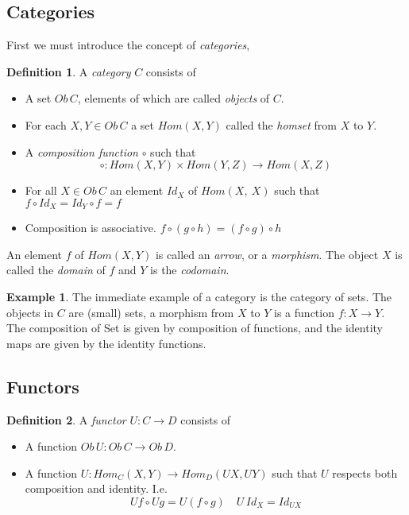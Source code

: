 \documentclass[a4paper,10pt]{article}
\theoremstyle{definition}
\newtheorem{definition}{Definition}[section]
\newtheorem{example}{Example}[section]
\begin{document}
\subsection{Categories}
First we must introduce the concept of \textit{categories},

\begin{definition}
    A \textit{category} $C$ consists of
    \begin{itemize}
        \item A set $Ob\,C$, elements of which are called \textit{objects} of $C$.
        \item For each $X, Y \in Ob\,C$
            a set $Hom(X,Y)$ called the \textit{homset} from $X$ to $Y$.
        \item A \textit{composition function} $\circ$ such that
            \begin{equation}
                \circ : Hom(X,Y) \times Hom(Y,Z) \rightarrow Hom(X,Z)
            \end{equation}
        \item For all $X \in Ob\,C$ an element $Id_X$ of $Hom(X,\ X)$
            such that $f \circ Id_X = Id_Y \circ f = f$
        \item Composition is associative.  $f \circ (g \circ h) = (f \circ g) \circ h$
    \end{itemize}
\end{definition}

\par
An element $f$ of $Hom(X,Y)$ is called an \textit{arrow},
or a \textit{morphism}. The object $X$ is called the \textit{domain} of $f$ and $Y$ is
the \textit{codomain}.\\

\begin{example}
    The immediate example of a category is the category of sets.
    The objects in $C$ are (small) sets,
    a morphism from $X$ to $Y$ is a function $f : X \rightarrow Y$.
    The composition of Set is given by composition of functions,
    and the identity maps are given by the identity functions.
\end{example}

\subsection{Functors}
\begin{definition}
    A \textit{functor} $U : C \rightarrow D$ consists of
    \begin{itemize}
        \item A function $Ob\,U : Ob\,C \rightarrow Ob\,D$.
        \item A function $U : Hom_C(X,Y) \rightarrow Hom_D(UX, UY)$
            such that $U$ respects both composition and identity.
            I.e.
            \begin{equation}
                Uf \circ Ug = U(f \circ g) \quad U\,Id_X = Id_{UX}
            \end{equation}
    \end{itemize}
\end{definition}
\end{document}
